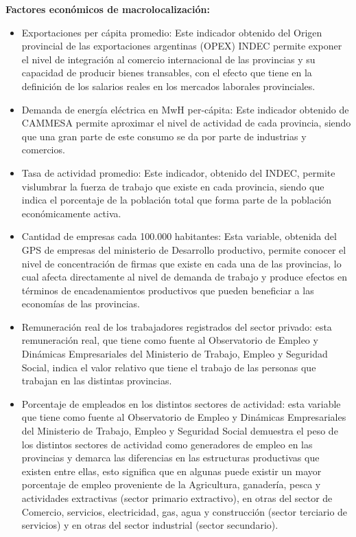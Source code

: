 \documentclass[12pt,a4paper]{article}
\begin{document}
\textbf{Factores económicos de macrolocalización:}
\begin{itemize}
\item Exportaciones per cápita promedio: Este indicador obtenido del Origen provincial de las exportaciones argentinas (OPEX) INDEC permite exponer el nivel de integración al comercio internacional de las provincias y su capacidad de producir bienes transables, con el efecto que tiene en la definición de los salarios reales en los mercados laborales provinciales.

\item Demanda de energía eléctrica en MwH per-cápita: Este indicador obtenido de CAMMESA permite aproximar el nivel de actividad de cada provincia, siendo que una gran parte de este consumo se da por parte de industrias y comercios.

\item Tasa de actividad promedio: Este indicador, obtenido del INDEC, permite vislumbrar la fuerza de trabajo que existe en cada provincia, siendo que indica el porcentaje de la población total que forma parte de la población económicamente activa.

\item Cantidad de empresas cada 100.000 habitantes: Esta variable, obtenida del GPS de empresas del ministerio de Desarrollo productivo, permite conocer el nivel de concentración de firmas que existe en cada una de las provincias, lo cual afecta directamente al nivel de demanda de trabajo y produce efectos en términos de encadenamientos productivos que pueden beneficiar a las economías de las provincias.

\item Remuneración real de los trabajadores registrados del sector privado: esta remuneración real, que tiene como fuente al Observatorio de Empleo y Dinámicas Empresariales del Ministerio de Trabajo, Empleo y Seguridad Social, indica el valor relativo que tiene el trabajo de las personas que trabajan en las distintas provincias.

\item Porcentaje de empleados en los distintos sectores de actividad: esta variable que tiene como fuente al Observatorio de Empleo y Dinámicas Empresariales del Ministerio de Trabajo, Empleo y Seguridad Social demuestra el peso de los distintos sectores de actividad como generadores de empleo en las provincias y  demarca las diferencias en las estructuras productivas que existen entre ellas, esto significa que en algunas puede existir un mayor porcentaje de empleo proveniente de la Agricultura, ganadería, pesca y actividades extractivas (sector primario extractivo), en otras del sector de Comercio, servicios, electricidad, gas, agua y construcción (sector terciario de servicios) y en otras del sector industrial (sector secundario).
\end{itemize}
\end{document}
